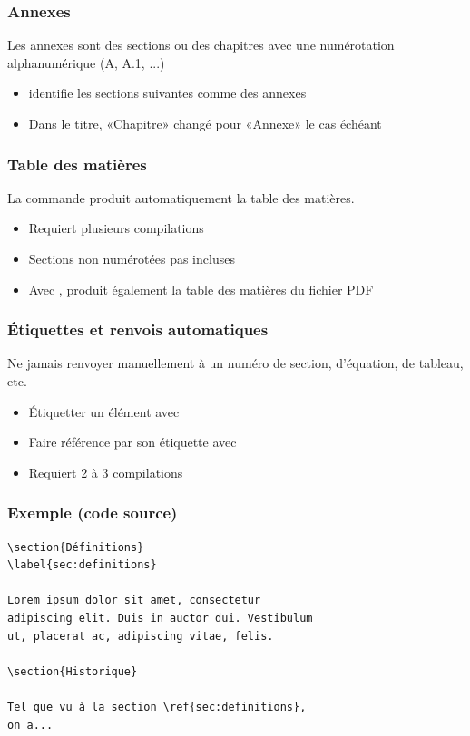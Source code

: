 \begin{frame}[fragile=singleslide]
  \frametitle{Annexes}

  Les annexes sont des sections ou des chapitres avec une numérotation
  alphanumérique (A, A.1, ...)
  \begin{itemize}
  \item {} identifie les sections suivantes comme des annexes
  \item Dans le titre, «Chapitre» changé pour «Annexe» le cas échéant
  \end{itemize}
\end{frame}

\begin{frame}[fragile=singleslide]
  \frametitle{Table des matières}

  La commande  produit automatiquement la table
  des matières.

  \begin{itemize}
  \item Requiert plusieurs compilations
  \item Sections non numérotées pas incluses
  \item Avec , produit également la table des
    matières du fichier PDF
  \end{itemize}
\end{frame}

\begin{frame}
  \frametitle{Étiquettes et renvois automatiques}

  Ne \alert{jamais} renvoyer manuellement à un numéro de section,
  d'équation, de tableau, etc.

  \begin{itemize}
  \item Étiquetter un élément avec 
  \item Faire référence par son étiquette avec 
  \item Requiert 2 à 3 compilations
  \end{itemize}
\end{frame}

\begin{frame}[fragile=singleslide]
  \frametitle{Exemple (code source)}

  \begin{lstlisting}[emph={\label,\ref}]
\section{Définitions}
\label{sec:definitions}

Lorem ipsum dolor sit amet, consectetur
adipiscing elit. Duis in auctor dui. Vestibulum
ut, placerat ac, adipiscing vitae, felis.

\section{Historique}

Tel que vu à la section \ref{sec:definitions},
on a...
\end{lstlisting}
\end{frame}


